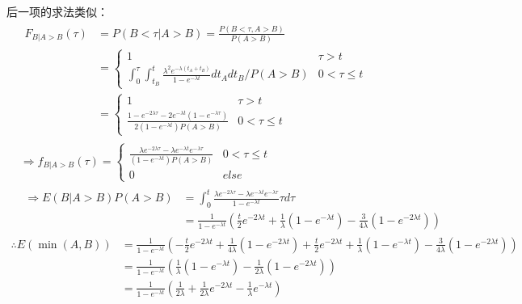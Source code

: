 后一项的求法类似：
\begin{equation}\tag*{}
\begin{split}
&\begin{split}
F_{B|A>B}(\tau)&=P(B<\tau|A>B)=\frac{P(B<\tau, A>B)}{P(A>B)}\\
&=\begin{cases}1&\tau>t\\\int_0^\tau\int_{t_B}^t\frac{\lambda^2e^{-\lambda(t_A+t_B)}}{1-e^{-\lambda t}}dt_Adt_B/P(A>B)&0<\tau\le t\end{cases}\\
&=\begin{cases}1&\tau>t\\\frac{1-e^{-2\lambda \tau}-2e^{-\lambda t}(1-e^{-\lambda \tau})}{2(1-e^{-\lambda t})P(A>B)}&0<\tau\le t\end{cases}
\end{split}\\
&\Rightarrow f_{B|A>B}(\tau)=\begin{cases}\frac{\lambda e^{-2\lambda\tau}-\lambda e^{-\lambda t}e^{-\lambda\tau}}{(1-e^{-\lambda t})P(A>B)} & 0<\tau \le t\\
0 & else
\end{cases}\\
&\begin{split}\Rightarrow E(B|A>B)P(A>B)&=\int_0^t\frac{\lambda e^{-2\lambda\tau}-\lambda e^{-\lambda t}e^{-\lambda\tau}}{1-e^{-\lambda t}}\tau d\tau\\&=\frac{1}{1-e^{-\lambda t}}\left(\frac{t}{2}e^{-2\lambda t}+\frac{1}{\lambda}(1-e^{-\lambda t})-\frac{3}{4\lambda}(1-e^{-2\lambda t})\right)\end{split}
\end{split}
\end{equation}
\begin{equation}\tag*{}
\begin{split}
\therefore E(\min(A, B))&=\frac{1}{1-e^{-\lambda t}}\left(-\frac{t}{2}e^{-2\lambda t}+\frac{1}{4\lambda}(1-e^{-2\lambda t})+\frac{t}{2}e^{-2\lambda t}+\frac{1}{\lambda}(1-e^{-\lambda t})-\frac{3}{4\lambda}(1-e^{-2\lambda t})\right)\\
&=\frac{1}{1-e^{-\lambda t}}\left(\frac{1}{\lambda}(1-e^{-\lambda t})-\frac{1}{2\lambda}(1-e^{-2\lambda t})\right)\\
&=\frac{1}{1-e^{-\lambda t}}\left(\frac{1}{2\lambda}+\frac{1}{2\lambda}e^{-2\lambda t}-\frac{1}{\lambda}e^{-\lambda t}\right)
\end{split}
\end{equation}

